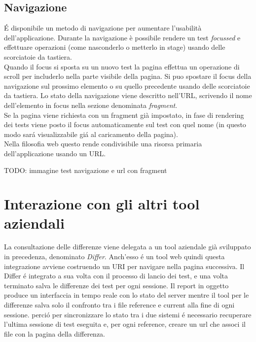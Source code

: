         \subsection{Navigazione}
            \'E  disponibile un metodo di navigazione per aumentare l'usabilità dell'applicazione.
            Durante la navigazione è possibile rendere un test \textit{focussed} e effettuare operazioni (come nasconderlo o metterlo in stage) usando delle scorciatoie da tastiera.\\
            Quando il focus si sposta su un nuovo test la pagina effettua un operazione di scroll per includerlo nella parte visibile della pagina.
            Si puo spostare il focus della navigazione sul prossimo elemento o su quello precedente usando delle scorciatoie da tastiera.
            Lo stato della navigazione viene descritto nell'URL, scrivendo il nome dell'elemento in focus nella sezione denominata \textit{fragment}.\\
            Se la pagina viene richiesta con un fragment già impostato, in fase di rendering dei tests viene posto il focus automaticamente sul test con quel nome (in questo modo sar\'a visualizzabile gi\'a al caricamento della pagina).\\
            Nella filosofia web questo rende condivisibile una risorsa primaria dell'applicazione usando un URL.

            TODO: immagine test navigazione e url con fragment
    \section{Interazione con gli altri tool aziendali}
        La consultazione delle differenze viene delegata a un tool aziendale già sviluppato in precedenza, denominato \textit{Differ}.
        Anch'esso \'e un tool web quindi questa integrazione avviene  costruendo un URI per navigare nella pagina successiva.
        Il Differ \'e integrato a sua volta con il processo di lancio dei test, e una volta terminato salva le differenze dei test per ogni sessione.
        Il report in oggetto produce un interfaccia in tempo reale con lo stato del server mentre il tool per le differenze salva solo il confronto tra i file reference e current alla fine di ogni sessione.
        perci\'o per sincronizzare lo stato tra i due sistemi \'e necessario recuperare l'ultima sessione di test eseguita e, per ogni reference, creare un url che associ il file con la pagina della differenza.